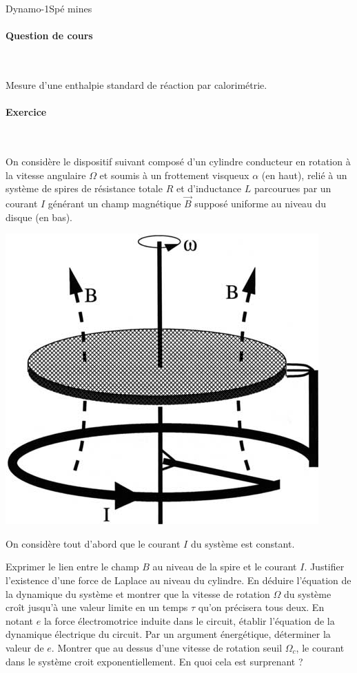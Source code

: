 \begin{exercise}{Dynamo}{-1}{Spé}
{}{mines}

\paragraph{Question de cours}~

Mesure d'une enthalpie standard de réaction par calorimétrie.

\paragraph{Exercice}~

On considère le dispositif suivant composé d'un cylindre conducteur en rotation à la vitesse angulaire $\Omega$  et soumis à un frottement visqueux $\alpha$ (en haut), relié à un système de spires de résistance totale $R$ et d'inductance $L$ parcourues par un courant $I$ générant un champ magnétique $\vec{B}$ supposé uniforme au niveau du disque (en bas).

\begin{center}
    \includegraphics[width=.5\linewidth]{oraux/mines/bullard-dynamo.png}
\end{center}

On considère tout d'abord que le courant $I$ du système est constant.

\begin{questions}
\question Exprimer le lien entre le champ $B$ au niveau de la spire et le courant $I$.
\question Justifier l'existence d'une force de Laplace au niveau du cylindre. En déduire l'équation de la dynamique du système et montrer que la vitesse de rotation $\Omega$ du système croît jusqu'à une valeur limite en un temps $\tau$ qu'on précisera tous deux.
\question En notant $e$ la force électromotrice induite dans le circuit, établir l'équation de la dynamique électrique du circuit.
\question Par un argument énergétique, déterminer la valeur de $e$.
\question Montrer que au dessus d'une vitesse de rotation seuil $\Omega_c$, le courant dans le système croit exponentiellement. En quoi cela est surprenant ?
\end{questions}


\end{exercise}
